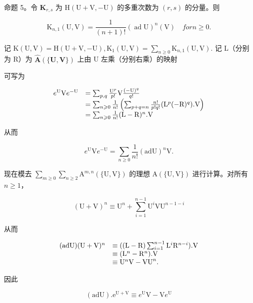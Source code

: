 命题 5。令 \(\mathbf{K}_{r,s}\) 为 \(\mathrm{H}(\mathrm{U} + \mathrm{V}, -\mathrm{U})\) 的多重次数为 \((r,s)\) 的分量。则

\[
\mathrm{K} _ {n, 1} (\mathrm{U}, \mathrm{V}) = \frac {1}{(n + 1) !} (\operatorname{ad} \mathrm{U}) ^ {n} (\mathrm{V}) \quad for n \geqslant 0.
\]

记 \(\mathrm{K}(\mathrm{U},\mathrm{V}) = \mathrm{H}(\mathrm{U} + \mathrm{V}, - \mathrm{U}),\mathrm{K}_1(\mathrm{U},\mathrm{V}) = \sum_{n\geqslant 0}\mathrm{K}_{n,1}(\mathrm{U},\mathrm{V}).\) 记 L（分别为 R）为 \(\hat{\mathbf{A}} (\{\mathbf{U},\mathbf{V}\})\) 上由 U 左乘（分别右乘）的映射

 可写为

\[
\begin{array}{r l} e ^ {\mathrm{U}} \mathrm{V} e ^ {- \mathrm{U}} & = \sum_ {p, q} \frac {\mathrm{U} ^ {p}}{p !} \mathrm{V} \frac {(- \mathrm{U}) ^ {q}}{q !} \\ & = \sum_ {n \geqslant 0} \frac {1}{n !} \left(\sum_ {p + q = n} \frac {n !}{p ! q !} (\mathrm{L} ^ {p} (- \mathrm{R}) ^ {q}). \mathrm{V}\right) \\ & = \sum_ {n \geqslant 0} \frac {1}{n !} (\mathrm{L} - \mathrm{R}) ^ {n}. \mathrm{V} \end{array}
\]

从而

\[
e ^ {\mathrm{U}} \mathrm{V} e ^ {- \mathrm{U}} = \sum_ {n \geqslant 0} \frac {1}{n !} (\mathrm{adU}) ^ {n} \mathrm{V}.\tag{22}
\]

现在模去 \(\sum_{m\geqslant 0}\sum_{n\geqslant 2}\mathrm{A}^{m,n}(\{\mathrm{U},\mathrm{V}\})\) 的理想 \(\mathrm{A}(\{\mathrm{U},\mathrm{V}\})\) 进行计算。对所有 \(n\geqslant 1\)，

\[
(\mathrm{U} + \mathrm{V}) ^ {n} \equiv \mathrm{U} ^ {n} + \sum_ {i = 1} ^ {n - 1} \mathrm{U} ^ {i} \mathrm{V} \mathrm{U} ^ {n - 1 - i}
\]

从而

\[
\begin{array}{r l} (\mathrm{adU}) (\mathrm{U} + \mathrm{V}) ^ {n} & \equiv ((\mathrm{L} - \mathrm{R}) \sum_ {i = 1} ^ {n - 1} \mathrm{L} ^ {i} \mathrm{R} ^ {n - i}). \mathrm{V} \\ & \equiv (\mathrm{L} ^ {n} - \mathrm{R} ^ {n}). \mathrm{V} \\ & \equiv \mathrm{U} ^ {n} \mathrm{V} - \mathrm{VU} ^ {n}. \end{array}
\]

因此

\[
(\mathrm{ad} \mathrm{U}). \mathrm{e} ^ {\mathrm{U} + \mathrm{V}} \equiv e ^ {\mathrm{U}} \mathrm{V} - \mathrm{V} e ^ {\mathrm{U}}\tag{23}
\]

